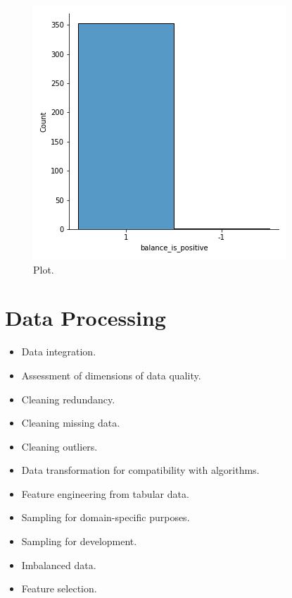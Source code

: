 \documentclass[a4paper,12pt]{report}
\begin{document}
		\begin{figure}[H]
		\begin{center}
		\includegraphics[scale=0.40]{positiveBalance_barChart}	
		\end{center}
		\caption{Plot.}
		\label{fig:positiveBalance_barChart}
		\end{figure}



\chapter{Data Processing}

\begin{itemize}
    \item Data integration.
    \item Assessment of dimensions of data quality.
    \item Cleaning redundancy.
    \item Cleaning missing data.
    \item Cleaning outliers.
    \item Data transformation for compatibility with algorithms.
    \item Feature engineering from tabular data.
    \item Sampling for domain-specific purposes.
    \item Sampling for development.
    \item Imbalanced data.
    \item Feature selection.
\end{itemize}
\end{document}
